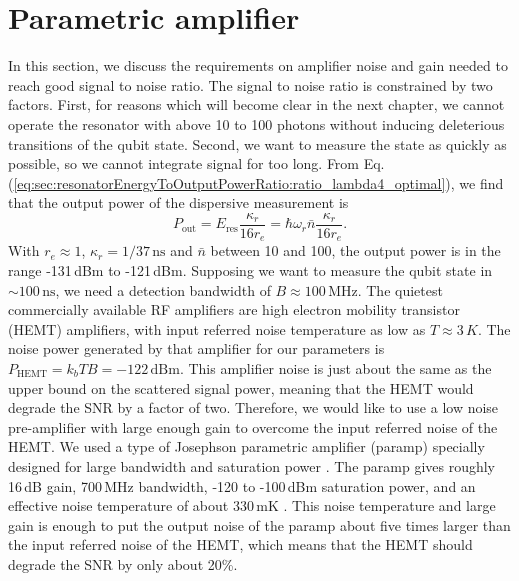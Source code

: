 \section{Parametric amplifier}

In this section, we discuss the requirements on amplifier noise and gain needed to reach good signal to noise ratio.
The signal to noise ratio is constrained by two factors.
First, for reasons which will become clear in the next chapter, we cannot operate the resonator with above 10 to 100 photons without inducing deleterious transitions of the qubit state.
Second, we want to measure the state as quickly as possible, so we cannot integrate signal for too long.
From Eq.\,(\ref{eq:sec:resonatorEnergyToOutputPowerRatio:ratio_lambda4_optimal}), we find that the output power of the dispersive measurement is
\begin{equation}
P_{\text{out}} = E_{\text{res}} \frac{\kappa_r}{16 r_e} = \hbar \omega_r \bar{n} \frac{\kappa_r}{16 r_e} .
\end{equation}
With $r_e \approx 1$, $\kappa_r = 1/37\,\text{ns}$ and $\bar{n}$ between 10 and 100, the output power is in the range -131\,dBm to -121\,dBm.
Supposing we want to measure the qubit state in $\sim 100 \, \text{ns}$, we need a detection bandwidth of $B \approx 100\,\text{MHz}$.
The quietest commercially available RF amplifiers are high electron mobility transistor (HEMT) amplifiers, with input referred noise temperature as low as $T \approx 3\,K$.
The noise power generated by that amplifier for our parameters is $P_{\text{HEMT}} = k_b T B = -122\,\text{dBm}$.
This amplifier noise is just about the same as the upper bound on the scattered signal power, meaning that the HEMT would degrade the SNR by a factor of two.
Therefore, we would like to use a low noise pre-amplifier with large enough gain to overcome the input referred noise of the HEMT.
We used a type of Josephson parametric amplifier (paramp) \cite{Yurke:squeezingTheory1987, Movshovich:squeezing1990, Yurke:paramp1996, Castellanos:paramp2007, Mutus:paramp2013} specially designed for large bandwidth and saturation power \cite{Mutus:IMPA2014}.
The paramp gives roughly 16\,dB gain, 700\,MHz bandwidth, -120 to -100\,dBm saturation power, and an effective noise temperature of about 330\,mK \cite{Mutus:IMPA2014}.
This noise temperature and large gain is enough to put the output noise of the paramp about five times larger than the input referred noise of the HEMT, which means that the HEMT should degrade the SNR by only about 20\%.
